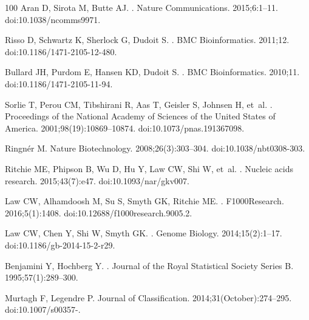 \documentclass[10pt,letterpaper]{article}
\begin{document}
\begin{thebibliography}{100}
Aran D, Sirota M, Butte AJ.
.
\newblock Nature Communications. 2015;6:1--11.
\newblock doi:{10.1038/ncomms9971}.

Risso D, Schwartz K, Sherlock G, Dudoit S.
.
\newblock BMC Bioinformatics. 2011;12.
\newblock doi:{10.1186/1471-2105-12-480}.

Bullard JH, Purdom E, Hansen KD, Dudoit S.
.
\newblock BMC Bioinformatics. 2010;11.
\newblock doi:{10.1186/1471-2105-11-94}.

Sorlie T, Perou CM, Tibshirani R, Aas T, Geisler S, Johnsen H, et~al.
.
\newblock Proceedings of the National Academy of Sciences of the United States
  of America. 2001;98(19):10869--10874.
\newblock doi:{10.1073/pnas.191367098}.

Ringn{\'{e}}r M.
\newblock Nature Biotechnology. 2008;26(3):303--304.
\newblock doi:{10.1038/nbt0308-303}.

Ritchie ME, Phipson B, Wu D, Hu Y, Law CW, Shi W, et~al.
.
\newblock Nucleic acids research. 2015;43(7):e47.
\newblock doi:{10.1093/nar/gkv007}.

Law CW, Alhamdoosh M, Su S, Smyth GK, Ritchie ME.
.
\newblock F1000Research. 2016;5(1):1408.
\newblock doi:{10.12688/f1000research.9005.2}.

Law CW, Chen Y, Shi W, Smyth GK.
.
\newblock Genome Biology. 2014;15(2):1--17.
\newblock doi:{10.1186/gb-2014-15-2-r29}.

Benjamini Y, Hochberg Y.
.
\newblock Journal of the Royal Statistical Society Series B.
  1995;57(1):289--300.

Murtagh F, Legendre P.
\newblock Journal of Classification. 2014;31(October):274--295.
\newblock doi:{10.1007/s00357-}.


\end{thebibliography}
\end{document}
